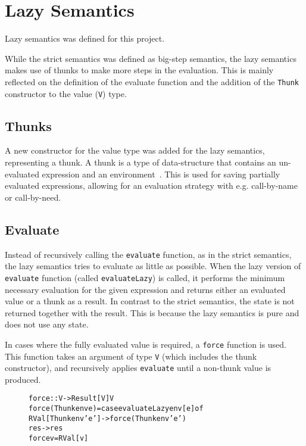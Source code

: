 \section{Lazy Semantics}
\label{LazySem}
Lazy semantics was defined for this project.

While the strict semantics was defined as big-step semantics, the lazy semantics
makes use of thunks to make more steps in the evaluation.
This is mainly reflected on the definition of the evaluate function
and the addition of the \texttt{Thunk} constructor to the value (\texttt{V})
type.

\subsection{Thunks}
A new constructor for the value type was added for the lazy semantics, representing
a thunk. A thunk is a type of data-structure that contains an un-evaluated expression
and an environment~\cite{Takano:2015:TRL:2695664.2695693}. This is used for saving
partially evaluated expressions, allowing for an evaluation strategy with e.g.
call-by-name or call-by-need.

\subsection{Evaluate}
\label{Eval}
Instead of recursively calling the \texttt{evaluate} function, as
in the strict semantics, the lazy semantics tries to evaluate as little as possible.
When the lazy version of \texttt{evaluate} function (called
\texttt{evaluateLazy}) is called, it performs the minimum necessary evaluation
for the given expression and returns either an evaluated value or a thunk as a result.
In contrast to the strict semantics, the state is not returned together with the
result. This is because the lazy semantics is pure and does not use any state.

In cases where the fully evaluated value is required, a \texttt{force} function is used.
This function takes an argument of type \texttt{V} (which includes the thunk constructor),
and recursively applies \texttt{evaluate} until a non-thunk value is produced.

\begin{figure}[!ht]
\begin{alltt}
force :: V -> Result [V] V
force (Thunk env e) = case evaluateLazy env [e] of
  RVal [Thunk env' e'] -> force (Thunk env' e')
  res -> res
force v = RVal [v]
\end{alltt}
\end{figure}

